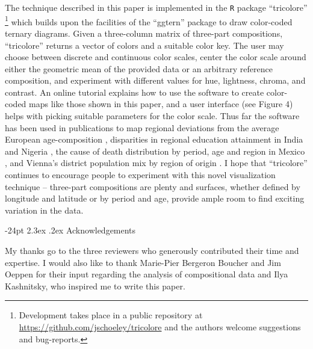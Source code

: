 \documentclass[10pt, twoside, parskip=half]{article}
\makeatletter
\renewcommand\section{\@startsection {section}{1}{\z@}%
                                   {-24pt}%
                                   {2.3ex \@plus.2ex}%
                                   {\normalfont\large\bfseries}}
\makeatother
\begin{document}
The technique described in this paper is implemented in the \texttt{R}
package ``tricolore'' \citep{Schoeley2019a}\footnote{Development takes
  place in a public repository at
  \url{https://github.com/jschoeley/tricolore} and the authors welcome
  suggestions and bug-reports.} which builds upon the facilities of the
``ggtern'' package \citep{Hamilton2018} to draw color-coded ternary
diagrams. Given a three-column matrix of three-part compositions,
``tricolore'' returns a vector of colors and a suitable color key. The
user may choose between discrete and continuous color scales, center the
color scale around either the geometric mean of the provided data or an
arbitrary reference composition, and experiment with different values
for hue, lightness, chroma, and contrast. An online tutorial
\citep{Schoeley2019b} explains how to use the software to create
color-coded maps like those shown in this paper, and a user interface
(see Figure 4) helps with picking suitable parameters for the color
scale. Thus far the software has been used in publications to map
regional deviations from the average European age-composition
\citep{Kashnitsky2018, Schoeley2019}, disparities in regional education
attainment in India and Nigeria \citep{Graetz2019}, the cause of death
distribution by period, age and region in Mexico \citep{Kashnitsky2019},
and Vienna's district population mix by region of origin
\citep{StadtWien2019}. I hope that ``tricolore'' continues to encourage
people to experiment with this novel visualization technique --
three-part compositions are plenty and surfaces, whether defined by
longitude and latitude or by period and age, provide ample room to find
exciting variation in the data.

\hypertarget{acknowledgements}{%
\section{Acknowledgements}\label{acknowledgements}}

My thanks go to the three reviewers who generously contributed their
time and expertise. I would also like to thank Marie-Pier Bergeron
Boucher and Jim Oeppen for their input regarding the analysis of
compositional data and Ilya Kashnitsky, who inspired me to write this
paper.

\newpage


\end{document}
